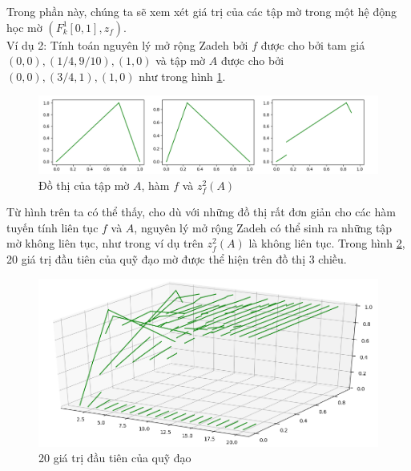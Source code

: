 \documentclass[../report.tex]{subfiles}
\begin{document}
Trong phần này, chúng ta sẽ xem xét giá trị của các 
tập mờ trong một hệ động học mờ $(F_k^1[0, 1], z_f)$. \\

\noindent Ví dụ 2: Tính toán nguyên lý mở rộng Zadeh bởi $f$ được 
cho bởi tam giá $(0, 0), (1/4, 9/10), (1, 0)$
và tập mờ $A$ được cho bởi $(0, 0), (3/4, 1), (1, 0)$ như trong 
hình \ref{fig:2}.
\begin{figure}[H]
\includegraphics[width=\textwidth]{figures/example2.png}
\caption{Đồ thị của tập mờ $A$, hàm $f$ và $z_f^2(A)$}
\label{fig:2}
\end{figure}

Từ hình trên ta có thể thấy, cho dù với những đồ thị rất đơn giản cho 
các hàm tuyến tính liên tục $f$ và $A$, nguyên lý mở rộng Zadeh 
có thể sinh ra những tập mờ không liên tục, như trong ví dụ trên
$z_f^2(A)$ là không liên tục. Trong hình \ref{fig:3}, 20 giá trị đầu tiên
của quỹ đạo mờ được thể hiện trên đồ thị 3 chiều. 

\begin{figure}[H]
\includegraphics[width=\textwidth]{figures/example2_3d.png}
\caption{20 giá trị đầu tiên của quỹ đạo}
\label{fig:3}
\end{figure}
\end{document}
